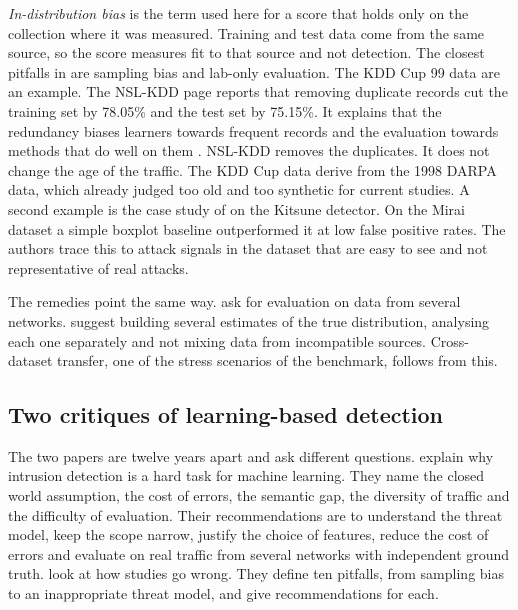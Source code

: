 \emph{In-distribution bias} is the term used here for a score that holds
only on the collection where it was measured. Training and test data come
from the same source, so the score measures fit to that source and not
detection. The closest pitfalls in \citet{arp2022dosdonts} are sampling bias
and lab-only evaluation. The KDD Cup 99 data are an example. The NSL-KDD
page reports that removing duplicate records cut the training set by 78.05\%
and the test set by 75.15\%. It explains that the redundancy biases learners
towards frequent records and the evaluation towards methods that do well on
them \citep{cic2009nslkdd}. NSL-KDD removes the duplicates. It does not
change the age of the traffic. The KDD Cup data derive from the 1998 DARPA data, which
\citet{sommer2010outside} already judged too old and too synthetic for
current studies. A second example is the case study of
\citet{arp2022dosdonts} on the Kitsune detector. On the Mirai dataset a
simple boxplot baseline outperformed it at low false positive rates. The
authors trace this to attack signals in the dataset that are easy to see and
not representative of real attacks.

The remedies point the same way. \citet{sommer2010outside} ask for
evaluation on data from several networks. \citet{arp2022dosdonts} suggest
building several estimates of the true distribution, analysing each one
separately and not mixing data from incompatible sources. Cross-dataset
transfer, one of the stress scenarios of the benchmark, follows from this.

\subsection{Two critiques of learning-based detection}
\label{sec:closed-world-dos-donts}

The two papers are twelve years apart and ask different questions.
\citet{sommer2010outside} explain why intrusion detection is a hard task for
machine learning. They name the closed world assumption, the cost of errors,
the semantic gap, the diversity of traffic and the difficulty of evaluation.
Their recommendations are to understand the threat model, keep the scope
narrow, justify the choice of features, reduce the cost of errors and
evaluate on real traffic from several networks with independent ground truth.
\citet{arp2022dosdonts} look at how studies go wrong. They define ten
pitfalls, from sampling bias to an inappropriate threat model, and give
recommendations for each.

